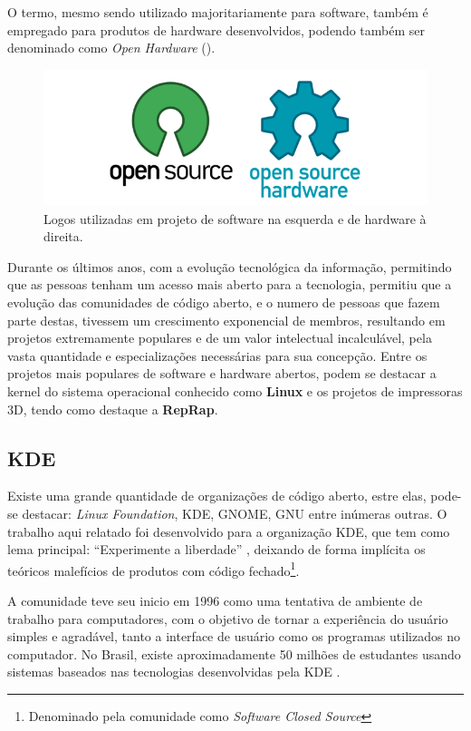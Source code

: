 
O termo, mesmo sendo utilizado majoritariamente para software, também é empregado para produtos de hardware desenvolvidos,
podendo também ser denominado como \textit{Open Hardware} ().

\begin{figure}[!htb]
  \centering
  \caption[\textit{Open Software} e \textit{Open Hardware} logos]{Logos utilizadas em projeto de software na esquerda e de hardware à direita.}
  \label{fig:osoh}
  \includegraphics[width=1\textwidth]{figuras/osoh.png}
\end{figure}

Durante os últimos anos, com a evolução tecnológica da informação, permitindo que as pessoas tenham um acesso mais aberto para
a tecnologia, permitiu que a evolução das comunidades de código aberto, e o numero de pessoas que fazem parte destas, tivessem
um crescimento exponencial de membros, resultando em projetos extremamente populares e de um valor intelectual incalculável,
pela vasta quantidade e especializações necessárias para sua concepção. Entre os projetos mais populares de software e hardware
abertos, podem se destacar a kernel do sistema operacional conhecido como \textbf{Linux} e os projetos de impressoras 3D, tendo
como destaque a \textbf{RepRap}.

\subsection{KDE}
Existe uma grande quantidade de organizações de código aberto, estre elas, pode-se destacar: \textit{Linux Foundation}, KDE, GNOME,
GNU entre inúmeras outras. O trabalho aqui relatado foi desenvolvido para a organização KDE, que tem como lema principal: ``Experimente
a liberdade'' \cite{kdelema}, deixando de forma implícita os teóricos malefícios de produtos com código fechado\footnote{Denominado pela
comunidade como \textit{Software Closed Source}}.

A comunidade teve seu inicio em 1996 como uma tentativa de ambiente de trabalho para computadores, com o objetivo
de tornar a experiência do usuário simples e agradável, tanto a interface de usuário como os programas utilizados no computador.
No Brasil, existe aproximadamente 50 milhões de estudantes usando sistemas baseados nas tecnologias desenvolvidas pela KDE
\cite{kdewhatis}.


